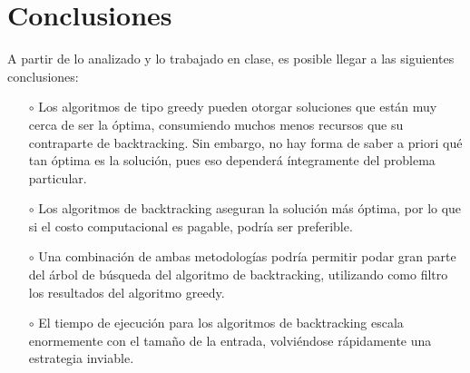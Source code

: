 \documentclass[10 pt, A4paper]{article}
\begin{document}
	\section*{Conclusiones}
	A partir de lo analizado y lo trabajado en clase, es posible llegar a las siguientes conclusiones:
	\begin{itemize}
		\item[$\circ$] Los algoritmos de tipo greedy pueden otorgar soluciones que están muy cerca de ser la óptima, consumiendo muchos menos recursos que su contraparte de backtracking. Sin embargo, no hay forma de saber a priori qué tan óptima es la solución, pues eso dependerá íntegramente del problema particular.
		\item[$\circ$] Los algoritmos de backtracking aseguran la solución más óptima, por lo que si el costo computacional es pagable, podría ser preferible.
		\item[$\circ$] Una combinación de ambas metodologías podría permitir podar gran parte del árbol de búsqueda del algoritmo de backtracking, utilizando como filtro los resultados del algoritmo greedy.
		\item[$\circ$] El tiempo de ejecución para los algoritmos de backtracking escala enormemente con el tamaño de la entrada, volviéndose rápidamente una estrategia inviable.
	\end{itemize}
	
	
\end{document}
